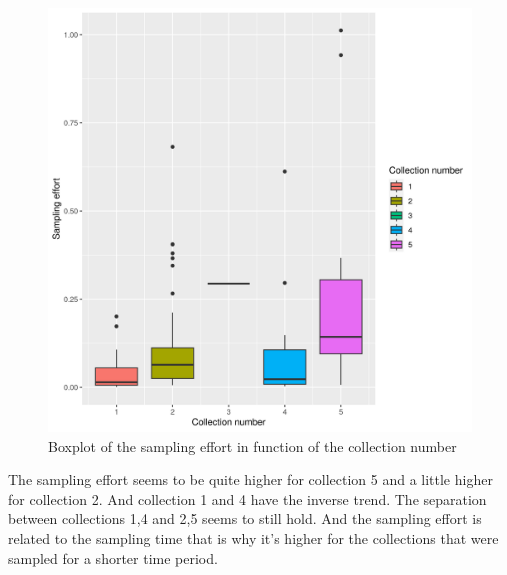 \begin{figure}
\centering
\includegraphics{./img/c75a33aa046b6f1bbcff45268346c4ec39067917.png}
\caption{\label{fig:boxplot-sampling-effort}Boxplot of the sampling
effort in function of the collection number}
\end{figure}

The sampling effort seems to be quite higher for collection 5 and a
little higher for collection 2. And collection 1 and 4 have the inverse
trend. The separation between collections 1,4 and 2,5 seems to still
hold. And the sampling effort is related to the sampling time that is
why it's higher for the collections that were sampled for a shorter time
period.
